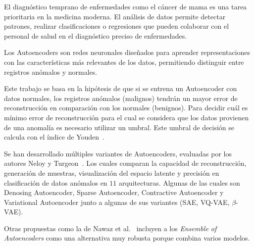 \documentclass{llncs}
\begin{document}

El diagnóstico temprano de enfermedades como el cáncer de mama es una tarea prioritaria en la medicina moderna. El análisis de datos permite detectar patrones, realizar clasificaciones o regresiones que pueden colaborar con el personal de salud en el diagnóstico preciso de  enfermedades. 


Los Autoencoders son redes neuronales diseñados para aprender representaciones con las características más relevantes de los datos, permitiendo distinguir entre registros anómalos y normales.


Este trabajo se basa en la hipótesis de que si se entrena un Autoencoder con datos normales, los registros anómalos (malignos) tendrán un mayor error de reconstrucción en comparación con los normales (benignos). Para decidir cuál es mínimo error de reconstrucción para el cual se considera que los datos provienen de una anomalía es necesario utilizar un umbral. Este umbral de decisión se calcula con el índice de Youden~\parencite{Indexforratingdiagnostictests}.


Se han desarrollado múltiples variantes de Autoencoders, evaluadas por los autores Neloy y Turgeon~\parencite{Acomprehensivestudyofautoencodersforanomalydetection}. Los cuales comparan la capacidad de reconstrucción, generación de muestras, visualización del espacio latente y precisión en clasificación de datos anómalos en $11$ arquitecturas.  Algunas de las cuales son Denosing
Autoencoder, Sparse Autoencoder, Contractive Autoencoder y Variational Autoencoder junto a algunas de
sus variantes (SAE, VQ-VAE, $\beta$-VAE).

Otras propuestas como la de Nawaz et al.~\parencite{Ensembleofautoencodersforanomaly} incluyen a los \emph{Ensemble of Autoencoders} como una alternativa muy robusta porque combina varios modelos.
\end{document}
